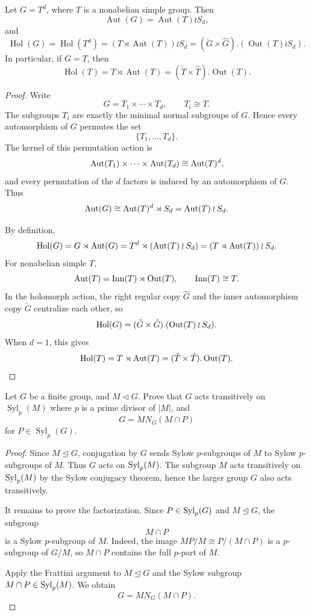 \begin{exercise}
Let \(G = T^d\), where \(T\) is a nonabelian simple group. Then
\[
    \operatorname{Aut}(G) = \operatorname{Aut}(T) \wr S_d,
\]
and
\[
    \operatorname{Hol}(G)
    =
    \operatorname{Hol}(T^d)
    =
    (T \rtimes \operatorname{Aut}(T)) \wr S_d
    =
    (\check{G} \times \hat{G}).(\operatorname{Out}(T) \wr S_d).
\]
In particular, if \(G = T\), then
\[
    \operatorname{Hol}(T)
    =
    T \rtimes \operatorname{Aut}(T)
    =
    (\check{T} \times \hat{T}).\operatorname{Out}(T).
\]
\end{exercise}

\begin{proof}
Write
\[
    G=T_1\times \cdots\times T_d,
    \qquad T_i\cong T.
\]
The subgroups \(T_i\) are exactly the minimal normal subgroups of \(G\). Hence
every automorphism of \(G\) permutes the set
\[
    \{T_1,\ldots,T_d\}.
\]
The kernel of this permutation action is
\[
    \operatorname{Aut}(T_1)\times\cdots\times \operatorname{Aut}(T_d)\cong \operatorname{Aut}(T)^d,
\]
and every permutation of the \(d\) factors is induced by an automorphism of
\(G\). Thus
\[
    \operatorname{Aut}(G)\cong \operatorname{Aut}(T)^d\rtimes S_d=\operatorname{Aut}(T)\wr S_d.
\]

By definition,
\[
    \operatorname{Hol}(G)=G\rtimes \operatorname{Aut}(G)
    =
    T^d\rtimes(\operatorname{Aut}(T)\wr S_d)
    =
    (T\rtimes \operatorname{Aut}(T))\wr S_d.
\]
For nonabelian simple \(T\),
\[
    \operatorname{Aut}(T)=\operatorname{Inn}(T)\rtimes \operatorname{Out}(T),
    \qquad
    \operatorname{Inn}(T)\cong T.
\]
In the holomorph action, the right regular copy \(\hat G\) and the inner
automorphism copy \(\check G\) centralize each other, so
\[
    \operatorname{Hol}(G)
    =
    (\check G\times \hat G).(\operatorname{Out}(T)\wr S_d).
\]
When \(d=1\), this gives
\[
    \operatorname{Hol}(T)=T\rtimes\operatorname{Aut}(T)
    =
    (\check T\times \hat T).\operatorname{Out}(T).
\]
\end{proof}

\begin{exercise}
Let \(G\) be a finite group, and \(M \lhd G\). Prove that \(G\) acts transitively
on \(\operatorname{Syl}_p(M)\) where \(p\) is a prime divisor of \(|M|\), and
\[
    G = M N_G(M \cap P)
\]
for \(P \in \operatorname{Syl}_p(G)\).
\end{exercise}

\begin{proof}
Since \(M\trianglelefteq G\), conjugation by \(G\) sends Sylow \(p\)-subgroups
of \(M\) to Sylow \(p\)-subgroups of \(M\). Thus \(G\) acts on
\(\operatorname{Syl}_p(M)\). The subgroup \(M\) acts transitively on \(\operatorname{Syl}_p(M)\) by the
Sylow conjugacy theorem, hence the larger group \(G\) also acts transitively.

It remains to prove the factorization. Since \(P\in \operatorname{Syl}_p(G)\) and
\(M\trianglelefteq G\), the subgroup
\[
    M\cap P
\]
is a Sylow \(p\)-subgroup of \(M\). Indeed, the image \(MP/M\cong P/(M\cap P)\)
is a \(p\)-subgroup of \(G/M\), so \(M\cap P\) contains the full \(p\)-part of
\(M\).

Apply the Frattini argument to \(M\trianglelefteq G\) and the Sylow subgroup
\(M\cap P\in \operatorname{Syl}_p(M)\). We obtain
\[
    G=M N_G(M\cap P).
\]
\end{proof}

